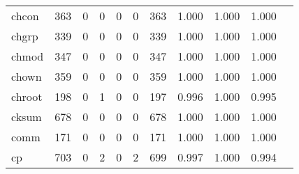\begin{longtable}{lp{1.10cm}p{1.10cm}p{1.10cm}p{1.10cm}p{1.10cm}p{1.10cm}p{1.10cm}p{1.10cm}p{1.10cm}p{1.10cm}}
chcon     &                    363 &                                  0 &                                 0 &                                0 &                                 0 &                             363 &                             1.000 &                                 1.000 &                               1.000 \\
chgrp     &                    339 &                                  0 &                                 0 &                                0 &                                 0 &                             339 &                             1.000 &                                 1.000 &                               1.000 \\
chmod     &                    347 &                                  0 &                                 0 &                                0 &                                 0 &                             347 &                             1.000 &                                 1.000 &                               1.000 \\
chown     &                    359 &                                  0 &                                 0 &                                0 &                                 0 &                             359 &                             1.000 &                                 1.000 &                               1.000 \\
chroot    &                    198 &                                  0 &                                 1 &                                0 &                                 0 &                             197 &                             0.996 &                                 1.000 &                               0.995 \\
cksum     &                    678 &                                  0 &                                 0 &                                0 &                                 0 &                             678 &                             1.000 &                                 1.000 &                               1.000 \\
comm      &                    171 &                                  0 &                                 0 &                                0 &                                 0 &                             171 &                             1.000 &                                 1.000 &                               1.000 \\
cp        &                    703 &                                  0 &                                 2 &                                0 &                                 2 &                             699 &                             0.997 &                                 1.000 &                               0.994 \\

\end{longtable}
